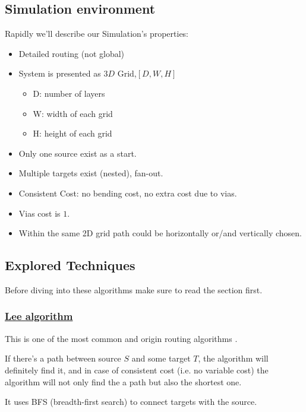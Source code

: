 \subsection{Simulation environment}
    Rapidly we'll describe our Simulation's properties:
    \begin{itemize}
        \item Detailed routing (not global)
        \item System is presented as $3D$ Grid,$[D, W, H]$
        \begin{itemize}
            \item D: number of layers 
            \item W: width of each grid
            \item H: height of each grid
        \end{itemize}
        \item Only one source exist as a start.
        \item Multiple targets exist (nested), fan-out.          
        \item Consistent Cost: no bending cost, no extra cost due to vias.
        \item Vias cost is $1$.
        \item Within the same 2D grid path could be horizontally or/and vertically
            chosen.
    \end{itemize}

\subsection{Explored Techniques}
    Before diving into these algorithms make sure to read the  section first.
    \newline

    \subsubsection{\underline{Lee algorithm}}
    \label{LeeSection}
    This is one of the most common and origin routing algorithms \cite{LeeRef}.

    If there's a path between source $S$ and some target $T$, the algorithm will definitely find it,
    and in case of consistent cost (i.e. no variable cost) the algorithm will not only find the 
    a path but also the shortest one.

    It uses BFS (breadth-first search) to connect targets with the source.

